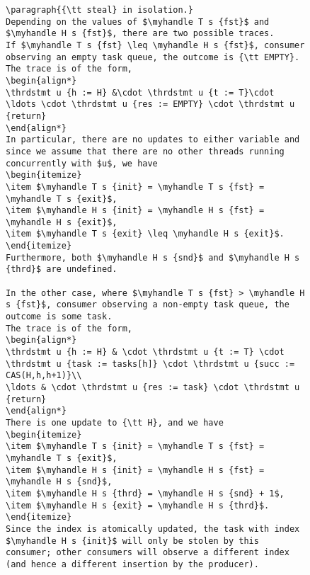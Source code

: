 \documentclass[a4paper]{article}
\begin{document}
{\begin{figure}
\begin{lstlisting}
\paragraph{{\tt steal} in isolation.}
Depending on the values of $\myhandle T s {fst}$ and $\myhandle H s {fst}$, there are two possible traces.
If $\myhandle T s {fst} \leq \myhandle H s {fst}$, consumer observing an empty task queue, the outcome is {\tt EMPTY}.
The trace is of the form,
\begin{align*}
\thrdstmt u {h := H} &\cdot \thrdstmt u {t := T}\cdot \ldots \cdot \thrdstmt u {res := EMPTY} \cdot \thrdstmt u {return}
\end{align*}
In particular, there are no updates to either variable and since we assume that there are no other threads running concurrently with $u$, we have
\begin{itemize}
\item $\myhandle T s {init} = \myhandle T s {fst} = \myhandle T s {exit}$,
\item $\myhandle H s {init} = \myhandle H s {fst} = \myhandle H s {exit}$,
\item $\myhandle T s {exit} \leq \myhandle H s {exit}$.
\end{itemize}
Furthermore, both $\myhandle H s {snd}$ and $\myhandle H s {thrd}$ are undefined.

In the other case, where $\myhandle T s {fst} > \myhandle H s {fst}$, consumer observing a non-empty task queue, the outcome is some task.
The trace is of the form,
\begin{align*}
\thrdstmt u {h := H} & \cdot \thrdstmt u {t := T} \cdot \thrdstmt u {task := tasks[h]} \cdot \thrdstmt u {succ := CAS(H,h,h+1)}\\
\ldots & \cdot \thrdstmt u {res := task} \cdot \thrdstmt u {return}
\end{align*}
There is one update to {\tt H}, and we have
\begin{itemize}
\item $\myhandle T s {init} = \myhandle T s {fst} = \myhandle T s {exit}$,
\item $\myhandle H s {init} = \myhandle H s {fst} = \myhandle H s {snd}$,
\item $\myhandle H s {thrd} = \myhandle H s {snd} + 1$,
\item $\myhandle H s {exit} = \myhandle H s {thrd}$.
\end{itemize}
Since the index is atomically updated, the task with index $\myhandle H s {init}$ will only be stolen by this consumer; other consumers will observe a different index (and hence a different insertion by the producer).




\end{lstlisting}
\end{figure}}
\end{document}
